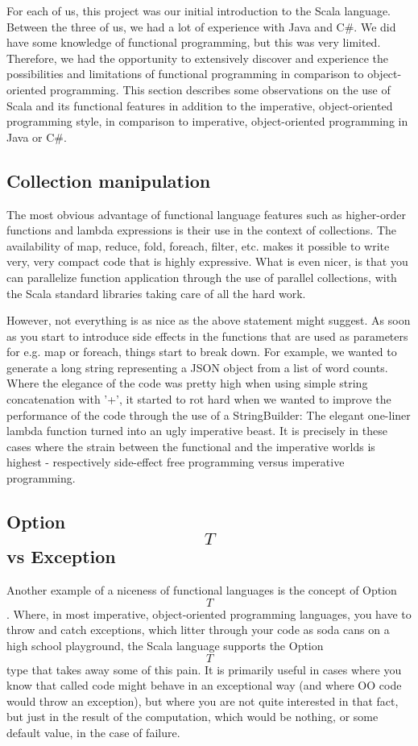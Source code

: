 
For each of us, this project was our initial introduction to the Scala
language. Between the three of us, we had a lot of experience with Java and C\#.
We did have some knowledge of functional programming, but this was very limited.
Therefore, we had the opportunity to extensively discover and experience the
possibilities and limitations of functional programming in comparison to
object-oriented programming. This section describes some observations on the use
of Scala and its functional features in addition to the imperative,
object-oriented programming style, in comparison to imperative, object-oriented
programming in Java or C\#.

\subsection{Collection manipulation}
The most obvious advantage of functional language features such as higher-order
functions and lambda expressions is their use in the context of collections. The
availability of map, reduce, fold, foreach, filter, etc. makes it possible to
write very, very compact code that is highly expressive. What is even nicer, is that
you can parallelize function application through the use of parallel collections,
with the Scala standard libraries taking care of all the hard work.

However, not everything is as nice as the above statement might suggest. As soon
as you start to introduce side effects in the functions that are used as parameters
for e.g. map or foreach, things start to break down. For example, we wanted to
generate a long string representing a JSON object from a list of word counts. Where
the elegance of the code was pretty high when using simple string concatenation with '+',
it started to rot hard when we wanted to improve the performance of the code through
the use of a StringBuilder: The elegant one-liner lambda function turned into an ugly
imperative beast. It is precisely in these cases where the strain between the functional and
the imperative worlds is highest - respectively side-effect free programming versus
imperative programming.

\subsection{Option\[T\] vs Exception}
Another example of a niceness of functional languages is the concept of Option\[T\].
Where, in most imperative, object-oriented programming languages, you have to throw
and catch exceptions, which litter through your code as soda cans on a high school playground,
the Scala language supports the Option\[T\] type that takes away some of this pain.
It is primarily useful in cases where you know that called code might behave in an
exceptional way (and where OO code would throw an exception), but where you are not
quite interested in that fact, but just in the result of the computation, which would
be nothing, or some default value, in the case of failure.

